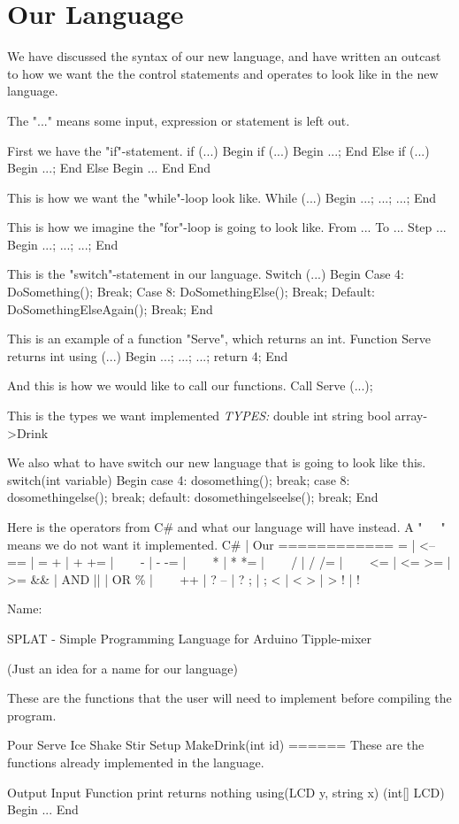 \chapter{Our Language}
We have discussed the syntax of our new language, and have written an outcast to how we want the the control statements and operates to look like in the new language.

The "..." means some input, expression or statement is left out.

First we have the "if"-statement.
if (...)
Begin
	if (...)
	Begin
		...;
	End
	Else if (...)
	Begin
		...;
	End
	Else
	Begin
	...
	End
End

This is how we want the "while"-loop look like.
While (...)
Begin
	...;
	...;
	...;
End
	
This is how we imagine the "for"-loop is going to look like.
From ... To ... Step ...
Begin
	...;
	...;
	...;
End

This is the "switch"-statement in our language.
Switch (...)
Begin
	Case 4:
		DoSomething();
		Break;
	Case 8:
		DoSomethingElse();
		Break;
	Default:
		DoSomethingElseAgain();
	Break;
End

This is an example of a function "Serve", which returns an int.
Function Serve returns int using (...)
Begin
	...;
	...;
	...;
	return 4;
End

And this is how we would like to call our functions.
Call Serve (...);

This is the types we want implemented
\textit{TYPES:}
double
int
string
bool
array->Drink

We also what to have switch our new language that is going to look like this.
switch(int variable)
Begin
	case 4:
		dosomething();
		break;
	case 8:
		dosomethingelse();
		break;
	default:
		dosomethingelseelse();
		break;
End

Here is the operators from C\# and what our language will have instead. A "~~~" means we do not want it implemented.
C\#	|	Our
============
=  	|	<--
==	|	=
+	|	+
+=	|	~~~
-	|	-
-=	|	~~~
*	|	*
*=	|	~~~
/	|	/
/=	|	~~~
<=	|	<=
>=	|	>=
&&	|	AND
||	|	OR
\%	|	~~~
++	|	?
--	|	?
;	|	;
<	|	<
>	|	>
!	|	!


Name:

SPLAT - Simple Programming Language for Arduino Tipple-mixer


(Just an idea for a name for our language)







These are the functions that the user will need to implement before compiling the program.

Pour
Serve
Ice
Shake
Stir
Setup
MakeDrink(int id)
======
These are the functions already implemented in the language.

Output
Input
Function print returns nothing using(LCD y, string x)     (int[] LCD)
Begin
	...
End